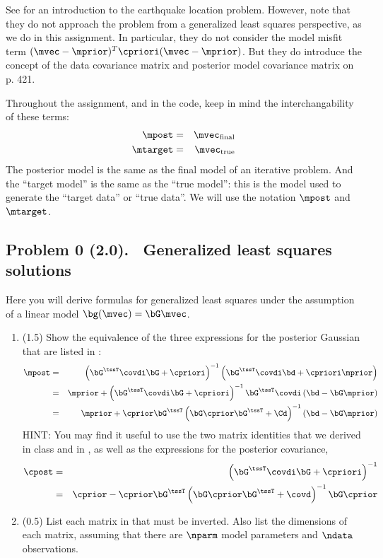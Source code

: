 \documentclass[11pt,titlepage,fleqn]{article}
\begin{document}
See \citet[][Chapter 7]{SteinWysession} for an introduction to the earthquake location problem. However, note that they do not approach the problem from a generalized least squares perspective, as we do in this assignment. In particular, they do not consider the model misfit term $(\mvec-\mprior)^T \cpriori (\mvec-\mprior)$. But they do introduce the concept of the data covariance matrix and posterior model covariance matrix on p. 421.

Throughout the assignment, and in the code, keep in mind the interchangability of these terms:
%
\begin{eqnarray*}
\mpost &=& \mvec_{\rm final}
\\
\mtarget &=& \mvec_{\rm true}
\end{eqnarray*}
%
The posterior model is the same as the final model of an iterative problem. And the ``target model'' is the same as the ``true model'': this is the model used to generate the ``target data'' or ``true data''. We will use the notation $\mpost$ and $\mtarget$.


\pagebreak
\subsection*{Problem 0 (2.0). \ptag\ Generalized least squares solutions}

Here you will derive formulas for generalized least squares under the assumption of a linear model $\bg(\mvec) = \bG\mvec$.
%
\begin{enumerate}
\item (1.5) Show the equivalence of the three expressions for the posterior Gaussian that are listed in \citet[][p.~66]{Tarantola2005}:
%
\begin{eqnarray}
\mpost &=& \left(\bG^{\tssT} \covdi \bG + \cpriori \right)^{-1}
\left( \bG^{\tssT} \covdi \bd + \cpriori\mprior \right)
\label{mpost1}
\\
&=& \mprior + \left(\bG^{\tssT} \covdi \bG + \cpriori \right)^{-1} \bG^{\tssT} \covdi \left( \bd - \bG \mprior\right)
\label{mpost2}
\\
&=& \mprior + \cprior \bG^{\tssT} \left( \bG \cprior \bG^{\tssT} + \Cd\right)^{-1} \left( \bd - \bG \mprior\right)
\label{mpost3}
\end{eqnarray}
%
HINT: You may find it useful to use the two matrix identities that we derived in class and in \citet[][Eq.~6.525]{Tarantola2005}, as well as the expressions for the posterior covariance,
%
\begin{eqnarray}
\cpost &=& \left(\bG^{\tssT} \covdi \bG + \cpriori \right)^{-1}
\label{cpost1}
\\
&=& \cprior - \cprior \bG^{\tssT} \left( \bG \cprior \bG^{\tssT} + \covd \right)^{-1} \bG \cprior
\label{cpost2}
\end{eqnarray}

\item (0.5) List each matrix in  that must be inverted. Also list the dimensions of each matrix, assuming that there are $\nparm$ model parameters and $\ndata$ observations.
\end{enumerate}
\end{document}
